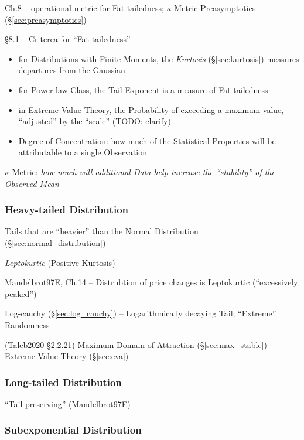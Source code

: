 Ch.8 -- operational metric for Fat-tailedness; $\kappa$ Metric \fist
Preasymptotics (\S\ref{sec:preasymptotics})

\S 8.1 -- Criterea for ``Fat-tailedness''

\begin{itemize}
  \item for Distributions with Finite Moments, the \emph{Kurtosis}
    (\S\ref{sec:kurtosis}) measures departures from the Gaussian
  \item for Power-law Class, the Tail Exponent is a measure of Fat-tailedness
  \item in Extreme Value Theory, the Probability of exceeding a maximum value,
    ``adjusted'' by the ``scale'' (TODO: clarify)
  \item Degree of Concentration: how much of the Statistical Properties will
    be attributable to a single Observation
\end{itemize}

$\kappa$ Metric: \emph{how much will additional Data help increase the
``stability'' of the Observed Mean}



\subsubsection{Heavy-tailed Distribution}\label{sec:heavy_tailed}

Tails that are ``heavier'' than the Normal Distribution
(\S\ref{sec:normal_distribution})

\emph{Leptokurtic} (Positive Kurtosis)

Mandelbrot97E, Ch.14 -- Distrubtion of price changes is Leptokurtic
(``excessively peaked'')

Log-cauchy (\S\ref{sec:log_cauchy}) -- Logarithmically decaying Tail;
``Extreme'' Randomness

(Taleb2020 \S 2.2.21) Maximum Domain of Attraction (\S\ref{sec:max_stable})
\fist Extreme Value Theory (\S\ref{sec:eva})



\subsubsection{Long-tailed Distribution}\label{sec:long_tailed}

``Tail-preserving'' (Mandelbrot97E)



\subsubsection{Subexponential Distribution}
\label{sec:subexponential_distribution}

